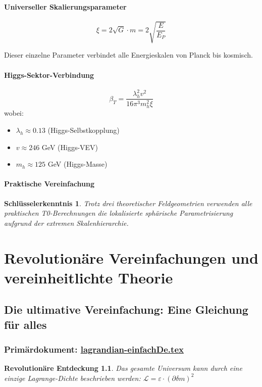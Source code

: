 \documentclass[12pt,a4paper]{report}
\newtheorem{insight}{Schlüsselerkenntnis}[chapter]
\newtheorem{discovery}{Revolutionäre Entdeckung}[chapter]
\begin{document}
	\subsubsection{Universeller Skalierungsparameter}
	$$\xi = 2\sqrt{G} \cdot m = 2\sqrt{\frac{E}{E_P}}$$
	
	Dieser einzelne Parameter verbindet alle Energieskalen von Planck bis kosmisch.
	
	\subsubsection{Higgs-Sektor-Verbindung}
	$$\beta_T = \frac{\lambda_h^2 v^2}{16\pi^3 m_h^2 \xi}$$
	wobei:
	\begin{itemize}
		\item $\lambda_h \approx 0.13$ (Higgs-Selbstkopplung)
		\item $v \approx 246$ GeV (Higgs-VEV)
		\item $m_h \approx 125$ GeV (Higgs-Masse)
	\end{itemize}
	
	\subsubsection{Praktische Vereinfachung}
	\begin{insight}
		Trotz drei theoretischer Feldgeometrien verwenden alle praktischen T0-Berechnungen die lokalisierte sphärische Parametrisierung aufgrund der extremen Skalenhierarchie.
	\end{insight}
	
	\chapter{Revolutionäre Vereinfachungen und vereinheitlichte Theorie}
	
	\section{Die ultimative Vereinfachung: Eine Gleichung für alles}
	\subsection{Primärdokument: \href{https://github.com/jpascher/T0-Time-Mass-Duality/tree/main/2/pdf/lagrandian-einfachDe.pdf}{lagrandian-einfachDe.tex}}
	
	\begin{discovery}
		Das gesamte Universum kann durch eine einzige Lagrange-Dichte beschrieben werden: $\mathcal{L} = \varepsilon \cdot (\partial \delta m)^2$
	\end{discovery}
	
\end{document}
